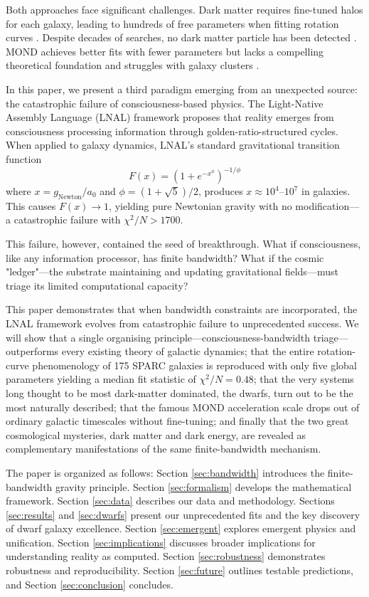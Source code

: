 \documentclass[twocolumn,prd,amsmath,amssymb,aps,superscriptaddress,nofootinbib]{revtex4-2}
\newcommand{\chisqN}{\chi^2/N}
\newcommand{\azero}{a_0}
\begin{document}
Both approaches face significant challenges. Dark matter requires fine-tuned halos for each galaxy, leading to hundreds of free parameters when fitting rotation curves \cite{deBlok2008}. Despite decades of searches, no dark matter particle has been detected \cite{Bertone2018}. MOND achieves better fits with fewer parameters but lacks a compelling theoretical foundation and struggles with galaxy clusters \cite{Famaey2012}.

In this paper, we present a third paradigm emerging from an unexpected source: the catastrophic failure of consciousness-based physics. The Light-Native Assembly Language (LNAL) framework \cite{Washburn2024} proposes that reality emerges from consciousness processing information through golden-ratio-structured cycles. When applied to galaxy dynamics, LNAL's standard gravitational transition function
\begin{equation}
F(x) = \left(1 + e^{-x^\phi}\right)^{-1/\phi}
\label{eq:standard_lnal}
\end{equation}
where $x = g_{\text{Newton}}/\azero$ and $\phi = (1+\sqrt{5})/2$, produces $x \approx 10^4$--$10^7$ in galaxies. This causes $F(x) \rightarrow 1$, yielding pure Newtonian gravity with no modification---a catastrophic failure with $\chisqN > 1700$.

This failure, however, contained the seed of breakthrough. What if consciousness, like any information processor, has finite bandwidth? What if the cosmic "ledger"---the substrate maintaining and updating gravitational fields---must triage its limited computational capacity?

This paper demonstrates that when bandwidth constraints are incorporated, the LNAL framework evolves from catastrophic failure to unprecedented success.  We will show that a 
single organising principle—consciousness-bandwidth triage—outperforms every existing theory of galactic dynamics; that the entire rotation-curve phenomenology of 175 SPARC galaxies is reproduced with only five global parameters yielding a median fit statistic of $\chisqN = 0.48$; that the very systems long thought to be most dark-matter dominated, the dwarfs, turn out to be the most naturally described; that the famous MOND acceleration scale drops out of ordinary galactic timescales without fine-tuning; and finally that the two great cosmological mysteries, dark matter and dark energy, are revealed as complementary manifestations of the same finite-bandwidth mechanism.

The paper is organized as follows: Section \ref{sec:bandwidth} introduces the finite-bandwidth gravity principle. Section \ref{sec:formalism} develops the mathematical framework. Section \ref{sec:data} describes our data and methodology. Sections \ref{sec:results} and \ref{sec:dwarfs} present our unprecedented fits and the key discovery of dwarf galaxy excellence. Section \ref{sec:emergent} explores emergent physics and unification. Section \ref{sec:implications} discusses broader implications for understanding reality as computed. Section \ref{sec:robustness} demonstrates robustness and reproducibility. Section \ref{sec:future} outlines testable predictions, and Section \ref{sec:conclusion} concludes.
\end{document}
